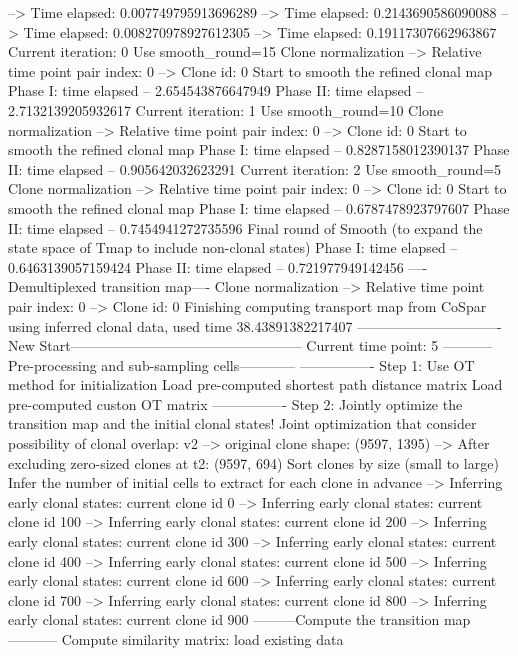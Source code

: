 \documentclass[letterpaper,10pt,english]{sphinxmanual}
\begin{document}
{\begin{sphinxVerbatim}[commandchars=\\\{\}]
--> Time elapsed:  0.007749795913696289
--> Time elapsed:  0.2143690586090088
--> Time elapsed:  0.008270978927612305
--> Time elapsed:  0.19117307662963867
Current iteration: 0
Use smooth\_round=15
Clone normalization
--> Relative time point pair index: 0
--> Clone id: 0
Start to smooth the refined clonal map
Phase I: time elapsed --  2.654543876647949
Phase II: time elapsed --  2.7132139205932617
Current iteration: 1
Use smooth\_round=10
Clone normalization
--> Relative time point pair index: 0
--> Clone id: 0
Start to smooth the refined clonal map
Phase I: time elapsed --  0.8287158012390137
Phase II: time elapsed --  0.905642032623291
Current iteration: 2
Use smooth\_round=5
Clone normalization
--> Relative time point pair index: 0
--> Clone id: 0
Start to smooth the refined clonal map
Phase I: time elapsed --  0.6787478923797607
Phase II: time elapsed --  0.7454941272735596
Final round of Smooth (to expand the state space of Tmap to include non-clonal states)
Phase I: time elapsed --  0.6463139057159424
Phase II: time elapsed --  0.721977949142456
----Demultiplexed transition map----
Clone normalization
--> Relative time point pair index: 0
--> Clone id: 0
Finishing computing transport map from CoSpar using inferred clonal data, used time 38.43891382217407
-------------------------------New Start--------------------------------------------------
Current time point: 5
-----------Pre-processing and sub-sampling cells------------
----------------
Step 1: Use OT method for initialization
Load pre-computed shortest path distance matrix
Load pre-computed custon OT matrix
----------------
Step 2: Jointly optimize the transition map and the initial clonal states!
Joint optimization that consider possibility of clonal overlap: v2
--> original clone shape: (9597, 1395)
--> After excluding zero-sized clones at t2: (9597, 694)
Sort clones by size (small to large)
Infer the number of initial cells to extract for each clone in advance
--> Inferring early clonal states: current clone id 0
--> Inferring early clonal states: current clone id 100
--> Inferring early clonal states: current clone id 200
--> Inferring early clonal states: current clone id 300
--> Inferring early clonal states: current clone id 400
--> Inferring early clonal states: current clone id 500
--> Inferring early clonal states: current clone id 600
--> Inferring early clonal states: current clone id 700
--> Inferring early clonal states: current clone id 800
--> Inferring early clonal states: current clone id 900
---------Compute the transition map-----------
Compute similarity matrix: load existing data

\end{sphinxVerbatim}}
\end{document}
